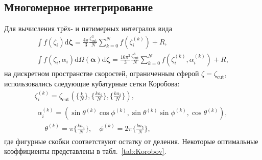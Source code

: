 \documentclass[a4paper,12pt]{article}
\newcommand{\dd}{\mathrm{d}}
\begin{document}
\subsection{Многомерное интегрирование}\label{sec:Korobov}

Для вычисления трёх- и пятимерных интегралов вида
\begin{gather}
    \int f(\zeta_i) \boldsymbol{\dd\zeta} = \frac{4\pi}{3}\frac{\zeta_\mathrm{cut}^3}{N}
        \sum_{k=0}^N f(\zeta_i^{(k)}) + R, \label{eq:dicrete_L}\\
    \int f(\zeta_i,\alpha_i) \dd\Omega(\boldsymbol{\alpha})\boldsymbol{\dd\zeta} = \frac{16\pi^2}{3}\frac{\zeta_\mathrm{cut}^3}{N}
        \sum_{k=0}^N f(\zeta_i^{(k)},\alpha_i^{(k)}) + R, \label{eq:dicrete_J}
\end{gather}
на дискретном пространстве скоростей, ограниченным сферой \(\zeta = \zeta_\mathrm{cut}\),
использовались следующие кубатурные сетки Коробова:
\begin{gather}
    \zeta_i^{(k)} = \zeta_\mathrm{cut}\left( \Big\{\frac{k}{N}\Big\}, \Big\{\frac{k a_2}{N}\Big\}, \Big\{\frac{k a_3}N\Big\} \right), \\
    \begin{split}
    \alpha_i^{(k)} = \left( \sin\theta^{(k)}\cos\phi^{(k)}, \sin\theta^{(k)}\sin\phi^{(k)}, \cos\theta^{(k)} \right), \\
    \quad \theta^{(k)} =  \pi\Big\{\frac{k a_4}{N}\Big\},
    \quad \phi^{(k)}   = 2\pi\Big\{\frac{k a_5}{N}\Big\},
    \end{split}
\end{gather}
где фигурные скобки соответствуют остатку от деления.
Некоторые оптимальные коэффициенты представлены в табл.~\ref{tab:Korobov}.
\end{document}
